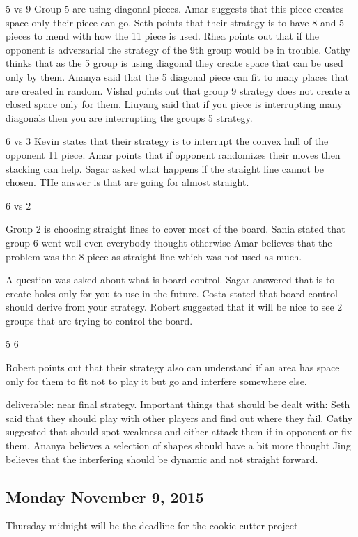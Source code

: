 5 vs 9
Group 5 are using diagonal pieces.
Amar suggests that this piece creates space only their piece can go.
Seth points that their strategy is to have 8 and 5 pieces to mend with how the 11 piece is used.
Rhea points out that if the opponent is adversarial the strategy of the 9th group would be in trouble.
Cathy thinks that as the 5 group is using diagonal they create space that can be used only by them.
Ananya said that the 5 diagonal piece can fit to many places that are created in random.
Vishal points out that group 9 strategy does not create a closed space only for them.
Liuyang  said that if you piece is interrupting many diagonals then you are interrupting the groups 5 strategy.


6 vs 3
Kevin states that their strategy is to interrupt the convex hull of the opponent 11 piece.
Amar points that if opponent randomizes their moves then stacking can help.
Sagar asked what happens if the straight line cannot be chosen. THe answer is that are going for almost straight.

6 vs 2

Group 2 is choosing straight lines to cover most of the board.
Sania stated that group 6 went well even everybody thought otherwise
Amar believes that the problem was the 8 piece as straight line which was not used as much.

A question was asked about what is board control.
Sagar answered that is to create holes only for you to use in the future.
Costa stated that board control should derive from your strategy.
Robert suggested that it will be nice to see 2 groups that are trying to control the board.

5-6

Robert points out that their strategy also can understand if an area has space only for them to fit not to play  it but go and interfere somewhere else.

deliverable: near final strategy.
Important things that should be dealt with:
Seth said that they should play with other players and find out where they fail.
Cathy suggested that should spot weakness and either attack them if in opponent or fix them.
Ananya believes a selection of shapes should have a bit more thought
Jing believes that the interfering should be dynamic and not straight forward.
\subsection{Monday November 9, 2015}
Thursday midnight will be the deadline for the cookie cutter project

